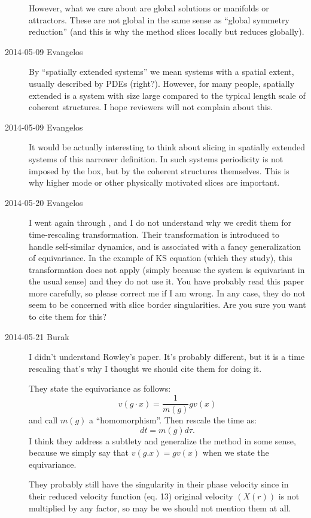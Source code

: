 \begin{description}
However, what we care about are global solutions or manifolds or attractors.
These are not global in the same sense as ``global symmetry reduction''
(and this is why the method slices locally but reduces globally).

\item[2014-05-09 Evangelos] By ``spatially extended systems'' we mean systems
with a spatial extent, usually described by PDEs (right?). However, for many
people, spatially extended is a system with size large
compared to the typical length scale of coherent structures. I hope reviewers
will not complain about this.

\item[2014-05-09 Evangelos] It would be actually interesting to think about slicing in
spatially extended systems of this narrower definition. In such systems periodicity is
not imposed by the box, but by the coherent structures themselves. This is why
higher mode or other physically motivated slices are important.

\item[2014-05-20 Evangelos] I went again through , and I do
not understand why we credit them for time-rescaling transformation. Their transformation
is introduced to handle self-similar dynamics, and is associated with a fancy generalization
of equivariance. In the example of KS equation (which they study), this transformation does not
apply (simply because the system is equivariant in the usual sense) and they do not use it.
You have probably read this paper more carefully, so please
correct me if I am wrong. In any case, they do not seem to be concerned with slice border
singularities. Are you sure you want to cite them for this?

\item[2014-05-21 Burak]
I didn't understand Rowley's paper. It's probably different, but it is a
time rescaling that's why I thought we should cite them for doing it.

They state the equivariance as follows:
\[
v(g\cdot x) = \frac{1}{m(g)} g v(x)
\]
and call $m(g)$ a ``homomorphism''. Then rescale the time as:
\[
dt = m(g) d\tau .
\]
I think they address a subtlety and  generalize the method in some sense,
because we simply say that $v(g . x) = g v(x)$ when we state the
equivariance.

They probably still have the singularity in their phase velocity since in
their reduced velocity function (eq. 13) original velocity $(X(r))$ is not
multiplied by any factor, so may be we should not mention them at all.


\end{description}
